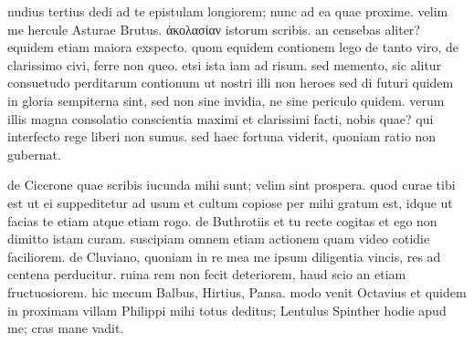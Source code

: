 


 nudius tertius dedi ad te epistulam longiorem; nunc ad ea quae proxime. velim me hercule Asturae Brutus. ἀκολασίαν istorum scribis. an censebas aliter? equidem etiam maiora exspecto. quom equidem contionem lego de tanto viro, de clarissimo civi, ferre non queo. etsi ista iam ad risum. sed memento, sic alitur consuetudo perditarum contionum ut nostri illi non heroes sed di futuri quidem in gloria sempiterna sint, sed non sine invidia, ne sine periculo quidem. verum illis magna consolatio conscientia maximi et clarissimi facti, nobis quae? qui interfecto rege liberi non sumus. sed haec fortuna viderit, quoniam ratio non gubernat.

 de Cicerone quae scribis iucunda mihi sunt; velim sint prospera. quod curae tibi est ut ei suppeditetur ad usum et cultum copiose per mihi gratum est, idque ut facias te etiam atque etiam rogo. de Buthrotiis et tu recte cogitas et ego non dimitto istam curam. suscipiam omnem etiam actionem quam video cotidie faciliorem. de Cluviano, quoniam in re mea me ipsum diligentia vincis, res ad centena perducitur. ruina rem non fecit deteriorem, haud scio an etiam fructuosiorem. hic mecum Balbus, Hirtius, Pansa. modo venit Octavius et quidem in proximam villam Philippi mihi totus deditus; Lentulus Spinther hodie apud me; cras mane vadit.
